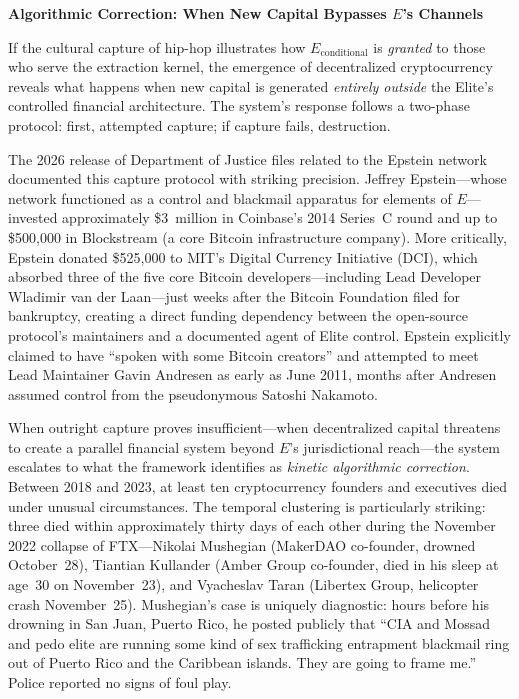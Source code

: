 \documentclass[12pt,openany]{book}
\begin{document}
\textbf{Algorithmic Correction: When New Capital Bypasses $E$'s Channels}

If the cultural capture of hip-hop illustrates how $E_{\text{conditional}}$ is \textit{granted} to those who serve the extraction kernel, the emergence of decentralized cryptocurrency reveals what happens when new capital is generated \textit{entirely outside} the Elite's controlled financial architecture. The system's response follows a two-phase protocol: first, attempted capture; if capture fails, destruction.

The 2026 release of Department of Justice files related to the Epstein network documented this capture protocol with striking precision. Jeffrey Epstein---whose network functioned as a control and blackmail apparatus for elements of $E$---invested approximately \$3~million in Coinbase's 2014 Series~C round and up to \$500,000 in Blockstream (a core Bitcoin infrastructure company). More critically, Epstein donated \$525,000 to MIT's Digital Currency Initiative (DCI), which absorbed three of the five core Bitcoin developers---including Lead Developer Wladimir van der Laan---just weeks after the Bitcoin Foundation filed for bankruptcy, creating a direct funding dependency between the open-source protocol's maintainers and a documented agent of Elite control. Epstein explicitly claimed to have ``spoken with some Bitcoin creators'' and attempted to meet Lead Maintainer Gavin Andresen as early as June 2011, months after Andresen assumed control from the pseudonymous Satoshi Nakamoto.

When outright capture proves insufficient---when decentralized capital threatens to create a parallel financial system beyond $E$'s jurisdictional reach---the system escalates to what the framework identifies as \textit{kinetic algorithmic correction}. Between 2018 and 2023, at least ten cryptocurrency founders and executives died under unusual circumstances. The temporal clustering is particularly striking: three died within approximately thirty days of each other during the November 2022 collapse of FTX---Nikolai Mushegian (MakerDAO co-founder, drowned October~28), Tiantian Kullander (Amber Group co-founder, died in his sleep at age~30 on November~23), and Vyacheslav Taran (Libertex Group, helicopter crash November~25). Mushegian's case is uniquely diagnostic: hours before his drowning in San Juan, Puerto Rico, he posted publicly that ``CIA and Mossad and pedo elite are running some kind of sex trafficking entrapment blackmail ring out of Puerto Rico and the Caribbean islands. They are going to frame me.'' Police reported no signs of foul play.
\end{document}

